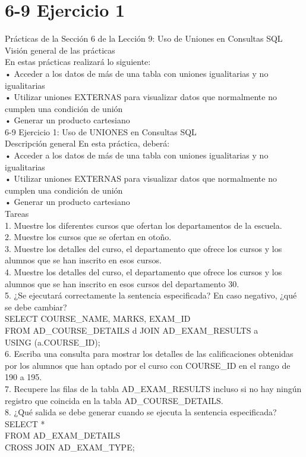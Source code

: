 \documentclass[a4paper,openright,12pt]{book}
\renewcommand\thesection{\arabic{section}}
\begin{document}
\section{6-9 Ejercicio 1}\label{se:nudo}
\lhead[\thepage/\pageref{LastPage}]{\thesection. Nudo}
\rhead[\thesection. Nudo]{\thepage/\pageref{LastPage}}
Prácticas de la Sección 6 de la Lección 9:  Uso de Uniones en Consultas SQL \\
Visión general de las prácticas \\
En estas prácticas realizará lo siguiente: \\
• Acceder a los datos de más de una tabla con uniones igualitarias y no igualitarias\\
• Utilizar uniones EXTERNAS para visualizar datos que normalmente no cumplen una condición de unión\\
• Generar un producto cartesiano\\
6-9 Ejercicio 1: Uso de UNIONES en Consultas SQL\\
Descripción general En esta práctica, deberá: \\
• Acceder a los datos de más de una tabla con uniones igualitarias y no igualitarias\\
• Utilizar uniones EXTERNAS para visualizar datos que normalmente no cumplen una condición de unión\\
• Generar un producto cartesiano \\
Tareas\\
1. Muestre los diferentes cursos que ofertan los departamentos de la escuela.\\
2. Muestre los cursos que se ofertan en otoño.\\
3. Muestre los detalles del curso, el departamento que ofrece los cursos y los alumnos que se han inscrito en esos cursos.\\
4. Muestre los detalles del curso, el departamento que ofrece los cursos y los alumnos que se han inscrito en esos cursos del departamento 30.\\
5. ¿Se ejecutará correctamente la sentencia especificada? En caso negativo, ¿qué se debe cambiar? \\

SELECT COURSE_NAME, MARKS, EXAM_ID \\
FROM AD_COURSE_DETAILS d JOIN AD_EXAM_RESULTS a \\
USING (a.COURSE_ID);  \\

6. Escriba una consulta para mostrar los detalles de las calificaciones obtenidas por los alumnos que han optado por el curso con COURSE_ID en el rango de 190 a 195.\\
7. Recupere las filas de la tabla AD_EXAM_RESULTS incluso si no hay ningún registro que coincida en la tabla AD_COURSE_DETAILS.\\
8. ¿Qué salida se debe generar cuando se ejecuta la sentencia especificada?\\
SELECT *\\
FROM AD_EXAM_DETAILS\\
CROSS JOIN AD_EXAM_TYPE;\\
\end{document}
